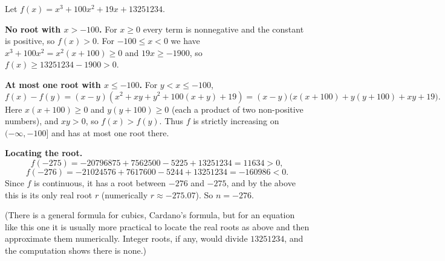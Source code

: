 Let $f(x)=x^3+100x^2+19x+13251234$.

\textbf{No root with $x>-100$.} For $x\ge0$ every term is nonnegative and the constant is positive, so $f(x)>0$. For $-100\le x<0$ we have $x^3+100x^2=x^2(x+100)\ge0$ and $19x\ge-1900$, so $f(x)\ge13251234-1900>0$.

\textbf{At most one root with $x\le-100$.} For $y<x\le-100$,
\[f(x)-f(y)=(x-y)\left(x^2+xy+y^2+100(x+y)+19\right)=(x-y)\bigl(x(x+100)+y(y+100)+xy+19\bigr).\]
Here $x(x+100)\ge0$ and $y(y+100)\ge0$ (each a product of two non-positive numbers), and $xy>0$, so $f(x)>f(y)$. Thus $f$ is strictly increasing on $(-\infty,-100]$ and has at most one root there.

\textbf{Locating the root.}
\[f(-275)=-20796875+7562500-5225+13251234=11634>0,\]
\[f(-276)=-21024576+7617600-5244+13251234=-160986<0.\]
Since $f$ is continuous, it has a root between $-276$ and $-275$, and by the above this is its only real root $r$ (numerically $r\approx-275.07$). So $n=\boxed{-276}$.

(There is a general formula for cubics, Cardano's formula, but for an equation like this one it is usually more practical to locate the real roots as above and then approximate them numerically. Integer roots, if any, would divide $13251234$, and the computation shows there is none.)
